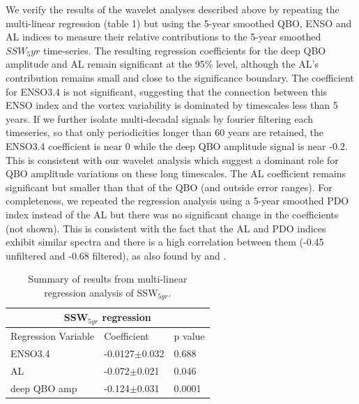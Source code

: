 We verify the results of the wavelet analyses described above by repeating the multi-linear regression (table 1) but using the 5-year smoothed QBO, ENSO and AL indices to measure their  relative contributions to the 5-year smoothed  $SSW_5yr$ time-series. The resulting regression coefficients for the deep QBO amplitude and AL remain significant at the 95\% level, although the AL's contribution remains small and close to the significance boundary. The coefficient for ENSO3.4 is not significant, suggesting that the connection between this ENSO index and the vortex variability is dominated by timescales less than 5 years. If we further isolate multi-decadal signals by fourier filtering each timeseries, so that only periodicities longer than 60 years are retained, the ENSO3.4 coefficient is near 0 while the deep QBO amplitude signal is near -0.2. This is consistent with our wavelet analysis which suggest a dominant role for QBO amplitude variations on these long timescales. The AL coefficient remains significant but smaller than that of the QBO (and outside error ranges). For completeness, we repeated the regression analysis using a 5-year smoothed PDO index instead of the AL but there was no significant change in the coefficients (not shown). This is consistent with the fact that the AL and PDO indices exhibit similar spectra and there is a high correlation between them (-0.45 unfiltered and -0.68 filtered), as also found by \cite{mantuaPacific1997} and \cite{rodionovSpatial2005}. 

\begin{table}
\centering
\begin{tabular}{|p{3cm}||p{3cm}|p{3cm}|}
 \hline
 \multicolumn{3}{|c|}{SSW$_{5yr}$ regression}\\
 \hline
 Regression Variable& Coefficient& p value\\
 \hline
 ENSO3.4  & -0.0127$\pm$0.032& 0.688\\
 AL  &   -0.072$\pm$0.021  & 0.046\\
 deep QBO amp &-0.124$\pm$0.031&0.0001\\
 \hline
\end{tabular}
\begin{center}
\caption{Summary of results from multi-linear regression analysis of SSW$_{5yr}$.} 
\end{center}
\end{table}

